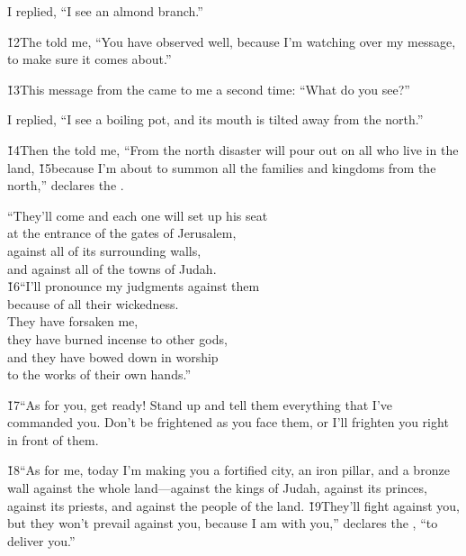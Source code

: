 I replied, ``I see an almond branch.''

\v{12}The  told me, ``You have observed well, because I'm watching over my message, to make sure it comes about.''

\v{13}This message from the  came to me a second time: ``What do you see?''

I replied, ``I see a boiling pot, and its mouth is tilted away from the north.''

\v{14}Then the  told me, ``From the north disaster will pour out on all who live in the land, \v{15}because I'm about to summon all the families and kingdoms from the north,'' declares the .

\begin{poetry}
\poeml ``They'll come and each one will set up his seat \\
\poemll    at the entrance of the gates of Jerusalem, \\
\poeml against all of its surrounding walls, \\
\poemll    and against all of the towns of Judah. \\
\poeml \v{16}``I'll pronounce my judgments against them \\
\poemll    because of all their wickedness. \\
\poeml They have forsaken me, \\
\poemll    they have burned incense to other gods, \\
\poeml and they have bowed down in worship \\
\poemll    to the works of their own hands.''
\end{poetry}

\v{17}``As for you, get ready! Stand up and tell them everything that I've commanded you. Don't be frightened as you face them, or I'll frighten you right in front of them.

\v{18}``As for me, today I'm making you a fortified city, an iron pillar, and a bronze wall against the whole land---against the kings of Judah, against its princes, against its priests, and against the people of the land. \v{19}They'll fight against you, but they won't prevail against you, because I am with you,'' declares the , ``to deliver you.''

